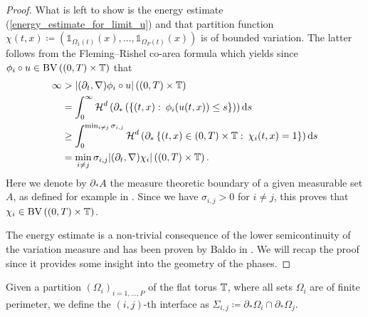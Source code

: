 \begin{proof}
 	What is left to show is the energy estimate (\ref{energy_estimate_for_limit_u}) and that partition function $ \chi ( t , x ) \coloneqq \left( \mathds{ 1 }_{ \Omega_{ 1 } ( t )  } ( x ) , \dotsc, \mathds{ 1 }_{ \Omega_{ P } ( t ) } ( x ) \right) $ is of bounded variation.
 	The latter follows from the Fleming--Rishel co-area formula \cite{Fleming_Rishel_coarea_formula} which yields since $ \phi_{ i } \circ u \in \operatorname{BV} \left( ( 0 , T ) \times \operatorname{\mathbb{T}} \right) $ that
 	\begin{align*}
 		\infty
 		& >
 		\abs{ 
 			( \partial_{ t } , \nabla )
 			\phi_{ i } \circ u
 		}
 		\left( ( 0 , T ) \times \operatorname{\mathbb{T}} \right)
 		\\
 		&
 		=
 		\int_{ 0 }^{ \infty }
 			\operatorname{\mathcal{H}}^{ d } \left(
 				\partial_{ \ast } \left(
 					\left\{
 						( t, x ) 
 						\, \colon \,
 						\phi_{ i } ( u ( t , x ) ) \leq s 
 					\right\}
 				 \right)
 			\right)
 		\dd{ s }
 		\\
 		&
 		\geq
 		\int_{ 0 }^{ \min_{ i \neq j } \sigma_{ i , j } }
 			\operatorname{\mathcal{H}}^{ d } \left(
 				\partial_{ \ast }
 				\left\{
 					( t , x ) \in ( 0 , T ) \times \operatorname{\mathbb{T}} 
 					\, \colon \,
 					\chi_{ i } ( t , x ) = 1
 				\right\}
 			\right)
 		\dd{ s }
 		\\
 		&=
 		\min_{ i \neq j }
 			\sigma_{ i , j }
 		\abs{
 			( \partial_{ t } , \nabla ) \chi_{ i }
 		}
 		\left(
 			( 0 , T ) \times \operatorname{\mathbb{T}}
 		\right).
 	\end{align*}
 	Here we denote by $ \partial_{ \ast } A $ the measure theoretic boundary of a given measurable set $ A $, as defined for example in \cite[Def.~5.7]{evans_gariepy_measure_theory_and_fine_props}.
 	Since we have $ \sigma_{ i , j } > 0 $ for $ i \neq j $, this proves that $ \chi_{ i } \in \operatorname{BV} \left( ( 0, T ) \times \operatorname{\mathbb{T}} \right) $.
 	
 	The energy estimate is a non-trivial consequence of the lower semicontinuity of the variation measure and has been proven by Baldo in \cite{baldo_minimal_interface_criterion}. We will recap the proof since it provides some insight into the geometry of the phases.
\end{proof}

\begin{definition}
	Given a partition $ \left( \Omega_{ i } \right)_{ i = 1 , \dotsc , P } $ of the flat torus $ \operatorname{\mathbb{T}} $, where all sets $ \Omega_{ i } $ are of finite perimeter, we define the $ (i,j)$-th interface as $ \Sigma_{ i , j } \coloneqq \partial_{ \ast } \Omega_{ i } \cap \partial_{ \ast } \Omega_{ j } $.
\end{definition}

